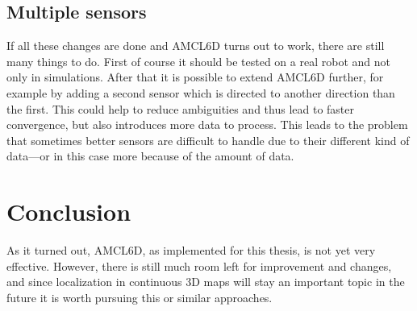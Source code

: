 \documentclass[Thesis.tex]{subfiles}
\begin{document}
\subsection*{Multiple sensors}

If all these changes are done and \gls{AMCL6D} turns out to work, there are still many things to do. First of course it should be tested on a real robot and not only in simulations. After that it is possible to extend \gls{AMCL6D} further, for example by adding a second sensor which is directed to another direction than the first. This could help to reduce ambiguities and thus lead to faster convergence, but also introduces more data to process. This leads to the problem that sometimes better sensors are difficult to handle due to their different kind of data\cite{Smithers:1994}---or in this case more because of the amount of data.

\section*{Conclusion}

As it turned out, \gls{AMCL6D}, as implemented for this thesis, is not yet very effective. However, there is still much room left for improvement and changes, and since localization in continuous 3D maps will stay an important topic in the future it is worth pursuing this or similar approaches. 
\end{document}
